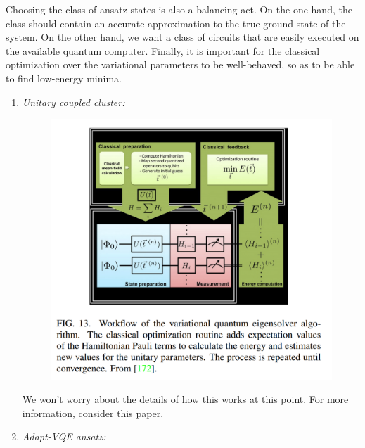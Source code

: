 \documentclass{book}
\theoremstyle{definition}
\begin{document}
Choosing the class of ansatz states is also a balancing act. On the one hand, the class should contain an accurate approximation to the true ground state of the system. On the other hand, we want a class of circuits that are easily executed on the available quantum computer. Finally, it
is important for the classical optimization over the variational
parameters to be well-behaved, so as to be able to find low-energy minima. 


\begin{enumerate}
	\item \textit{Unitary coupled cluster:} \\
	
	\begin{figure}[!htb]
		\centering
		\includegraphics[scale=0.3]{vqei}
	\end{figure}
	We won't worry about the details of how this works at this point. For more information, consider this \href{https://iopscience.iop.org/article/10.1088/2058-9565/aad3e4/pdf}{\underline{paper}}.
	

	
	\item \textit{Adapt-VQE ansatz:}\\
	

\end{enumerate}
\end{document}
